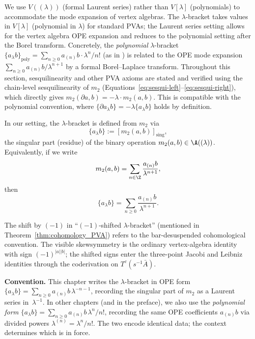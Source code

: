 \begin{remark}
We use $V((\lambda))$ (formal Laurent series) rather than $V[\lambda]$ (polynomials) to accommodate the mode expansion of vertex algebras. The $\lambda$-bracket takes values in $V[\lambda]$ (polynomial in $\lambda$) for standard PVAs; the Laurent series setting allows for the vertex algebra OPE expansion and reduces to the polynomial setting after the Borel transform. Concretely, the \emph{polynomial} $\lambda$-bracket $\{a_\lambda b\}_{\mathrm{poly}} = \sum_{n \geq 0} a_{(n)} b \cdot \lambda^n / n!$ (as in \cite{Kac98}) is related to the OPE mode expansion $\sum_{n \geq 0} a_{(n)} b / \lambda^{n+1}$ by a formal Borel--Laplace transform. Throughout this section, sesquilinearity and other PVA axioms are stated and verified using the chain-level sesquilinearity of $m_2$ (Equations~\eqref{eq:sesqui-left}--\eqref{eq:sesqui-right}), which directly gives $m_2(\partial a, b) = -\lambda \cdot m_2(a,b)$. This is compatible with the polynomial convention, where $\{\partial a_\lambda b\} = -\lambda \{a_\lambda b\}$ holds by definition.
\end{remark}

\begin{remark}[Connection to $m_2$]
In our setting, the $\lambda$-bracket is defined from $m_2$ via
\[
\{a_\lambda b\} := [m_2(a, b)]_{\text{sing}},
\]
the singular part (residue) of the binary operation $m_2(a,b) \in \A((\lambda))$. Equivalently, if we write
\[
m_2(a,b) = \sum_{n \in \Z} \frac{a_{(n)} b}{\lambda^{n+1}},
\]
then
\[
\{a_\lambda b\} = \sum_{n \geq 0} \frac{a_{(n)} b}{\lambda^{n+1}}.
\]

The shift by $(-1)$ in ``$(-1)$-shifted $\lambda$-bracket''
(mentioned in Theorem~\ref{thm:cohomology_PVA}) refers to the
bar-desuspended cohomological convention. The visible skewsymmetry is
the ordinary vertex-algebra identity with sign $(-1)^{|a||b|}$; the
shifted signs enter the three-point Jacobi and Leibniz identities
through the coderivation on $T^c(s^{-1}\bar A)$.

\textbf{Convention.}
This chapter writes the $\lambda$-bracket in OPE form
$\{a_\lambda b\} = \sum_{n \ge 0} a_{(n)}b\,\lambda^{-n-1}$,
recording the singular part of $m_2$ as a Laurent series in~$\lambda^{-1}$.
In other chapters (and in the preface), we also use the \emph{polynomial form}
$\{a_\lambda b\} = \sum_{n \ge 0} a_{(n)}b\,\lambda^{n}/n!$,
recording the same OPE coefficients $a_{(n)}b$ via divided powers $\lambda^{(n)} = \lambda^n/n!$.
The two encode identical data; the context determines which is in force.
\end{remark}

